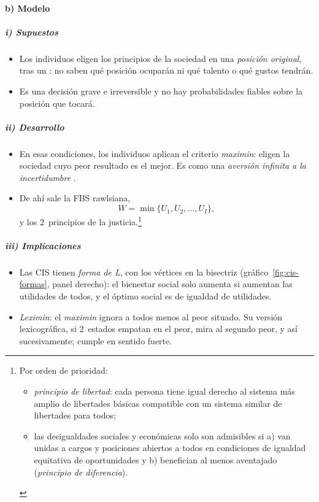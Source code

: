 \documentclass[11pt]{article}
\begin{document}
\paragraph{b) Modelo}

\subparagraph{i) Supuestos}

\begin{itemize}
\item Los individuos eligen los principios de la sociedad en una \emph{posición original}, tras un : no saben qué posición ocuparán ni qué talento o qué gustos tendrán.
\item Es una decisión grave e irreversible y no hay probabilidades fiables sobre la posición que tocará.
\end{itemize}

\subparagraph{ii) Desarrollo}

\begin{itemize}
\item En esas condiciones, los individuos aplican el criterio \emph{maximin}: eligen la sociedad cuyo peor resultado es el mejor. Es como una \emph{aversión infinita a la incertidumbre} .
\item De ahí sale la FBS rawlsiana,
  $$W=\min\{U_1,U_2,\dots,U_I\},$$
  y los 2~principios de la justicia.\footnote{Por orden de prioridad:
\begin{itemize}
\item \emph{principio de libertad}: cada persona tiene igual derecho al sistema más amplio de libertades básicas compatible con un sistema similar de libertades para todos;
\item las desigualdades sociales y económicas solo son admisibles si a) van unidas a cargos y posiciones abiertos a todos en condiciones de igualdad equitativa de oportunidades y b) benefician al menos aventajado (\emph{principio de diferencia})\nocite{Rawls1971Theory}.
\end{itemize}}
\end{itemize}

\subparagraph{iii) Implicaciones}

\begin{itemize}
\item Las CIS tienen \emph{forma de L}, con los vértices en la bisectriz (gráfico~\ref{fig:cis-formas}, panel derecho): el bienestar social solo aumenta si aumentan las utilidades de todos, y el óptimo social es de igualdad de utilidades.
\item \emph{Leximin}: el \emph{maximin} ignora a todos menos al peor situado. Su versión lexicográfica, si 2~estados empatan en el peor, mira al segundo peor, y así sucesivamente; cumple  en sentido fuerte\nocite{Sen1970Collective,Hammond1976Equity}.
\end{itemize}
\end{document}
